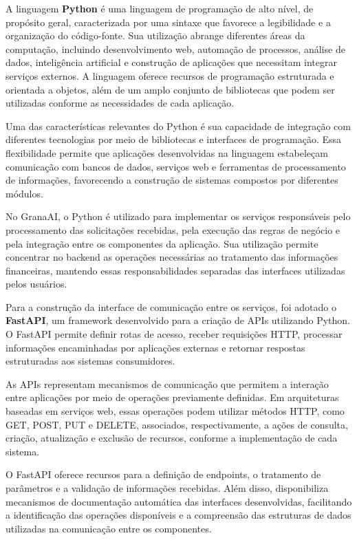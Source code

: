 A linguagem \textbf{Python} é uma linguagem de programação de alto nível, de propósito geral, caracterizada por uma sintaxe que favorece a legibilidade e a organização do código-fonte. Sua utilização abrange diferentes áreas da computação, incluindo desenvolvimento web, automação de processos, análise de dados, inteligência artificial e construção de aplicações que necessitam integrar serviços externos. A linguagem oferece recursos de programação estruturada e orientada a objetos, além de um amplo conjunto de bibliotecas que podem ser utilizadas conforme as necessidades de cada aplicação.

Uma das características relevantes do Python é sua capacidade de integração com diferentes tecnologias por meio de bibliotecas e interfaces de programação. Essa flexibilidade permite que aplicações desenvolvidas na linguagem estabeleçam comunicação com bancos de dados, serviços web e ferramentas de processamento de informações, favorecendo a construção de sistemas compostos por diferentes módulos.

No GranaAI, o Python é utilizado para implementar os serviços responsáveis pelo processamento das solicitações recebidas, pela execução das regras de negócio e pela integração entre os componentes da aplicação. Sua utilização permite concentrar no backend as operações necessárias ao tratamento das informações financeiras, mantendo essas responsabilidades separadas das interfaces utilizadas pelos usuários.

Para a construção da interface de comunicação entre os serviços, foi adotado o \textbf{FastAPI}, um framework desenvolvido para a criação de APIs utilizando Python. O FastAPI permite definir rotas de acesso, receber requisições HTTP, processar informações encaminhadas por aplicações externas e retornar respostas estruturadas aos sistemas consumidores.

As APIs representam mecanismos de comunicação que permitem a interação entre aplicações por meio de operações previamente definidas. Em arquiteturas baseadas em serviços web, essas operações podem utilizar métodos HTTP, como GET, POST, PUT e DELETE, associados, respectivamente, a ações de consulta, criação, atualização e exclusão de recursos, conforme a implementação de cada sistema.

O FastAPI oferece recursos para a definição de endpoints, o tratamento de parâmetros e a validação de informações recebidas. Além disso, disponibiliza mecanismos de documentação automática das interfaces desenvolvidas, facilitando a identificação das operações disponíveis e a compreensão das estruturas de dados utilizadas na comunicação entre os componentes.

